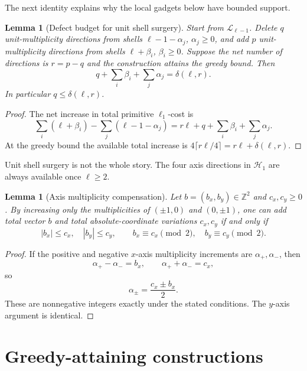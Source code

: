 \documentclass[11pt]{article}
\newtheorem{lemma}[theorem]{Lemma}
\theoremstyle{definition}
\newcommand{\Z}{\mathbb Z}
\newcommand{\HH}{\mathcal H}
\newcommand{\LL}{\mathcal L}
\begin{document}
The next identity explains why the local gadgets below have bounded support.

\begin{lemma}[Defect budget for unit shell surgery]\label{lem:defbudget}
Start from \(\LL_{\ell-1}\).  Delete \(q\) unit-multiplicity directions from shells
\(\ell-1-\alpha_j\), \(\alpha_j\ge0\), and add \(p\) unit-multiplicity directions from shells
\(\ell+\beta_i\), \(\beta_i\ge0\).  Suppose the net number of directions is \(r=p-q\) and the construction attains the greedy bound.  Then
\begin{equation}\label{eq:defbudget}
q+\sum_i\beta_i+\sum_j\alpha_j=\delta(\ell,r).
\end{equation}
In particular \(q\le\delta(\ell,r)\).
\end{lemma}

\begin{proof}
The net increase in total primitive \(\ell_1\)-cost is
\[
\sum_i(\ell+\beta_i)-\sum_j(\ell-1-\alpha_j)
=
r\ell+q+\sum_i\beta_i+\sum_j\alpha_j.
\]
At the greedy bound the available total increase is
\(4\lceil r\ell/4\rceil=r\ell+\delta(\ell,r)\).
\end{proof}

Unit shell surgery is not the whole story.  The four axis directions in \(\HH_1\) are always available once \(\ell\ge2\).

\begin{lemma}[Axis multiplicity compensation]\label{lem:axis}
Let \(b=(b_x,b_y)\in\Z^2\) and \(c_x,c_y\ge0\).  By increasing only the multiplicities of
\((\pm1,0)\) and \((0,\pm1)\), one can add total vector \(b\) and total absolute-coordinate variations \(c_x,c_y\) if and only if
\[
|b_x|\le c_x,\quad |b_y|\le c_y,\qquad
b_x\equiv c_x\pmod2,\quad b_y\equiv c_y\pmod2.
\]
\end{lemma}

\begin{proof}
If the positive and negative \(x\)-axis multiplicity increments are \(\alpha_+,\alpha_-\), then
\[
\alpha_+-\alpha_-=b_x,\qquad
\alpha_++\alpha_-=c_x,
\]
so
\[
\alpha_\pm=\frac{c_x\pm b_x}{2}.
\]
These are nonnegative integers exactly under the stated conditions.  The \(y\)-axis argument is identical.
\end{proof}

\section{Greedy-attaining constructions}\label{sec:construct}
\end{document}
